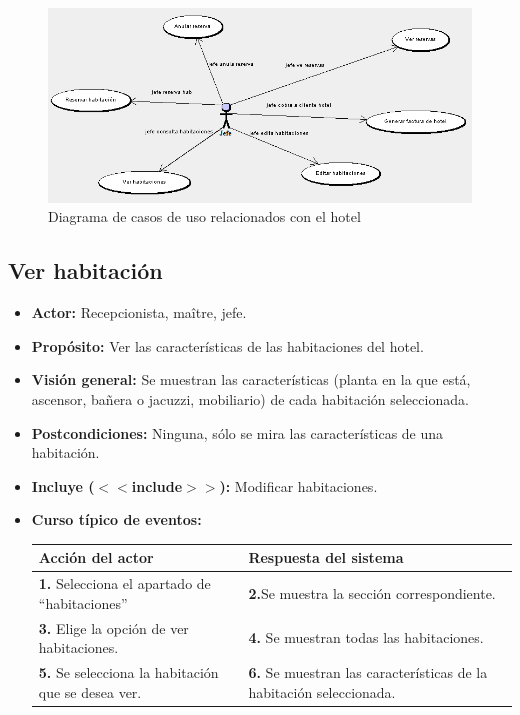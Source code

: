\documentclass[spanish,a4paper,11pt, twoside]{report}	%
\begin{document}
	\begin{figure}[!h]
		\centering
		\includegraphics[scale=0.5]{Habitaciones.png}
		\caption{Diagrama de casos de uso relacionados con el hotel}
	\end{figure}



	\subsection{Ver habitación}
		\begin{itemize}
			\item \textbf{Actor:} Recepcionista, maître, jefe.
			\item \textbf{Propósito: } Ver las características de las habitaciones del hotel.
			\item \textbf{Visión general:} Se muestran las características (planta en la que
					está, ascensor, bañera o jacuzzi, mobiliario) de cada habitación seleccionada.
			\item \textbf{Postcondiciones:} Ninguna, sólo se mira las características de una habitación.
			\item \textbf{Incluye ($<<$include$>>$):} Modificar habitaciones.
			\item \textbf{Curso típico de eventos:} 	\\
				\begin{tabular}{|p{6cm}||p{6cm}|}
				\hline
				\textbf{Acción del actor} & \textbf{Respuesta del sistema} \\ \hline
				\textbf{1.} Selecciona el apartado de ``habitaciones'' & 
				\textbf{2.}Se muestra la sección correspondiente.\\ \hline 
				\textbf{3.} Elige la opción de ver habitaciones. & 
				\textbf{4.} Se muestran todas las habitaciones.  \\ \hline
				\textbf{5.} Se selecciona la habitación que se desea ver. & 
				\textbf{6.} Se muestran las características de la habitación seleccionada. \\ \hline
			\end{tabular}
			\\
		\end {itemize}
		
\end{document}
